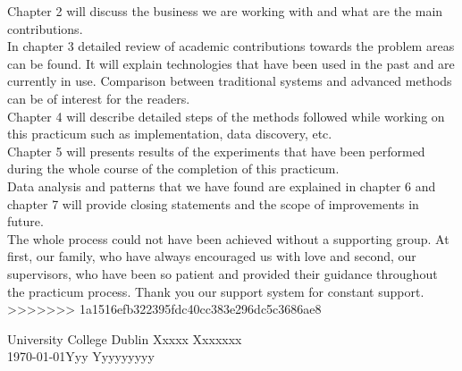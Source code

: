 Chapter 2 will discuss the business we are working with and what are the main contributions.\\

In chapter 3 detailed review of academic contributions towards the problem areas can be found. It will explain technologies that have been used in the past and are currently in use. Comparison between traditional systems and advanced methods can be of interest for the readers.\\

Chapter 4 will describe detailed steps of the methods followed while working on this practicum such as implementation, data discovery, etc.\\

Chapter 5 will presents results of the experiments that have been performed during the whole course of the completion of this practicum.\\

Data analysis and patterns that we have found are explained in chapter 6 and chapter 7 will provide closing statements and the scope of improvements in future.\\

The whole process could not have been achieved without a supporting group. At first, our family, who have always encouraged us with love and second, our supervisors, who have been so patient and provided their guidance throughout the practicum process. Thank you our support system for constant support.
>>>>>>> 1a1516efb322395fdc40cc383e296dc5c3686ae8

\vspace{2em}

University College Dublin \hfill Xxxxx Xxxxxxx \\
\today \hfill Yyy Yyyyyyyyy
